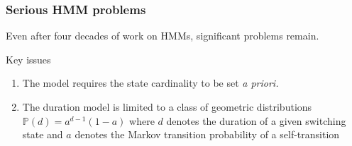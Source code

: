 \documentclass[aspectratio=169]{beamer}
\begin{document}
\begin{frame}
    \frametitle{Serious HMM problems}

    Even after four decades of work on HMMs, significant problems remain.

    \begin{block}{Key issues}
        \begin{enumerate}
            \item The model requires the state cardinality to be set \textit{a priori.}
            \item The duration model is limited to a class of geometric distributions $\mathbb{P}(d) = a^{d-1} (1-a)$ where $d$ denotes the duration of a given switching state and $a$ denotes the Markov transition probability of a self-transition
        \end{enumerate}
    \end{block}

\end{frame}
\end{document}

